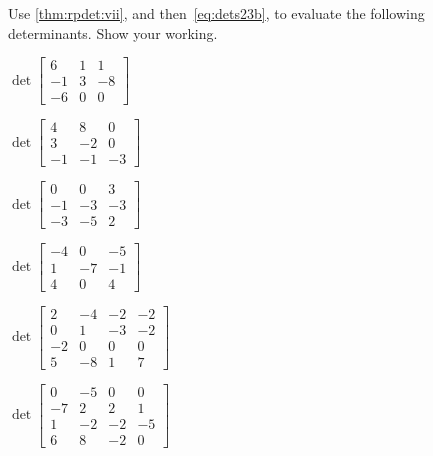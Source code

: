 \begin{exercise}  
Use \cref{thm:rpdet:vii}, and then~\eqref{eq:dets23b}, to evaluate the following determinants.
Show your working.
\begin{Parts}
\item \(\det\begin{bmatrix} 6 & 1 & 1
\\-1 & 3 & -8
\\-6 & 0 & 0 \end{bmatrix}\)

\item \(\det\begin{bmatrix} 4 & 8 & 0
\\3 & -2 & 0
\\-1 & -1 & -3 \end{bmatrix}\)

\begin{reduce}
\item \(\det\begin{bmatrix} 0 & 0 & 3
\\-1 & -3 & -3
\\-3 & -5 & 2 \end{bmatrix}\)

\item \(\det\begin{bmatrix} -4 & 0 & -5
\\1 & -7 & -1
\\4 & 0 & 4 \end{bmatrix}\)
\end{reduce}

\item \(\det\begin{bmatrix} 2 & -4 & -2 & -2
\\0 & 1 & -3 & -2
\\-2 & 0 & 0 & 0
\\5 & -8 & 1 & 7 \end{bmatrix}\)

\item \(\det\begin{bmatrix} 0 & -5 & 0 & 0
\\-7 & 2 & 2 & 1
\\1 & -2 & -2 & -5
\\6 & 8 & -2 & 0 \end{bmatrix}\)


\end{Parts}
\end{exercise}
